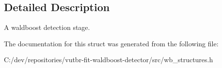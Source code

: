 \subsection{Detailed Description}
A waldboost detection stage. 

The documentation for this struct was generated from the following file\+:\begin{DoxyCompactItemize}
\item 
C\+:/dev/repositories/vutbr-\/fit-\/waldboost-\/detector/src/wb\+\_\+structures.\+h\end{DoxyCompactItemize}
